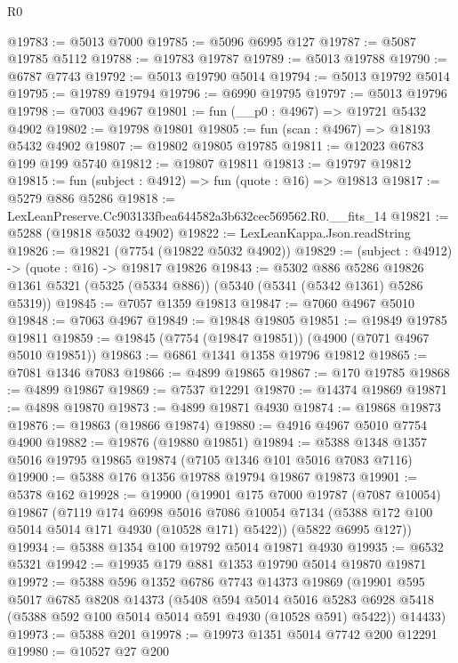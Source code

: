 \begin{lexlean}{R0}
\begin{coremodule}
@19783 := @5013 @7000
@19785 := @5096 @6995 @127
@19787 := @5087 @19785 @5112
@19788 := @19783 @19787
@19789 := @5013 @19788
@19790 := @6787 @7743
@19792 := @5013 @19790 @5014
@19794 := @5013 @19792 @5014
@19795 := @19789 @19794
@19796 := @6990 @19795
@19797 := @5013 @19796
@19798 := @7003 @4967
@19801 := fun (__p0 : @4967) => @19721 @5432 @4902
@19802 := @19798 @19801
@19805 := fun (scan : @4967) => @18193 @5432 @4902
@19807 := @19802 @19805 @19785
@19811 := @12023 @6783 @199 @199 @5740
@19812 := @19807 @19811
@19813 := @19797 @19812
@19815 := fun (subject : @4912) => fun (quote : @16) => @19813
@19817 := @5279 @886 @5286
@19818 := LexLeanPreserve.Cc903133fbea644582a3b632cec569562.R0.__fits_14
@19821 := @5288 (@19818 @5032 @4902)
@19822 := LexLeanKappa.Json.readString
@19826 := @19821 (@7754 (@19822 @5032 @4902))
@19829 := (subject : @4912) -> (quote : @16) -> @19817 @19826
@19843 := @5302
    @886
    @5286
    @19826
    @1361
    @5321
    (@5325 (@5334 @886))
    (@5340 (@5341 (@5342 @1361) @5286 @5319))
@19845 := @7057 @1359 @19813
@19847 := @7060 @4967 @5010
@19848 := @7063 @4967
@19849 := @19848 @19805
@19851 := @19849 @19785 @19811
@19859 := @19845 (@7754 (@19847 @19851)) (@4900 (@7071 @4967 @5010 @19851))
@19863 := @6861 @1341 @1358 @19796 @19812
@19865 := @7081 @1346 @7083
@19866 := @4899 @19865
@19867 := @170 @19785
@19868 := @4899 @19867
@19869 := @7537 @12291
@19870 := @14374 @19869
@19871 := @4898 @19870
@19873 := @4899 @19871 @4930
@19874 := @19868 @19873
@19876 := @19863 (@19866 @19874)
@19880 := @4916 @4967 @5010 @7754 @4900
@19882 := @19876 (@19880 @19851)
@19894 := @5388 @1348 @1357 @5016 @19795 @19865 @19874 (@7105 @1346 @101 @5016 @7083 @7116)
@19900 := @5388 @176 @1356 @19788 @19794 @19867 @19873
@19901 := @5378 @162
@19928 := @19900
    (@19901
      @175
      @7000
      @19787
      (@7087 @10054)
      @19867
      (@7119
        @174
        @6998
        @5016
        @7086
        @10054
        @7134
        (@5388 @172 @100 @5014 @5014 @171 @4930 (@10528 @171) @5422))
      (@5822 @6995 @127))
@19934 := @5388 @1354 @100 @19792 @5014 @19871 @4930
@19935 := @6532 @5321
@19942 := @19935 @179 @881 @1353 @19790 @5014 @19870 @19871
@19972 := @5388
    @596
    @1352
    @6786
    @7743
    @14373
    @19869
    (@19901
      @595
      @5017
      @6785
      @8208
      @14373
      (@5408
        @594
        @5014
        @5016
        @5283
        @6928
        @5418
        (@5388 @592 @100 @5014 @5014 @591 @4930 (@10528 @591) @5422))
      @14433)
@19973 := @5388 @201
@19978 := @19973 @1351 @5014 @7742 @200 @12291
@19980 := @10527 @27 @200

\end{coremodule}
\end{lexlean}

